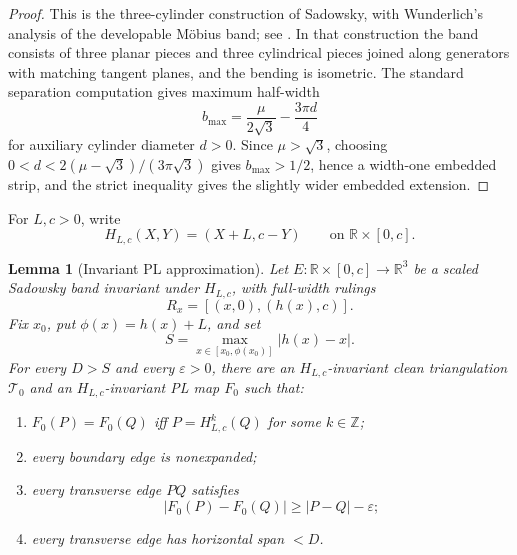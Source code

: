 \documentclass[12pt]{article}
\newcommand{\R}{\mathbb R}
\newcommand{\Z}{\mathbb Z}
\theoremstyle{plain}
\newtheorem{lemma}[theorem]{Lemma}
\begin{document}
\begin{proof}
This is the three-cylinder construction of Sadowsky, with Wunderlich's
analysis of the developable M\"obius band; see \cite{Sad30,Wun62}.  In that
construction the band consists of three planar pieces and three cylindrical
pieces joined along generators with matching tangent planes, and the bending is
isometric.  The standard separation computation gives maximum half-width
\[
b_{\max}=\frac{\mu}{2\sqrt3}-\frac{3\pi d}{4}
\]
for auxiliary cylinder diameter \(d>0\).  Since \(\mu>\sqrt3\), choosing
\(0<d<2(\mu-\sqrt3)/(3\pi\sqrt3)\) gives \(b_{\max}>1/2\), hence a width-one
embedded strip, and the strict inequality gives the slightly wider embedded
extension.
\end{proof}

For \(L,c>0\), write
\[
H_{L,c}(X,Y)=(X+L,c-Y)\qquad\text{on }\R\times[0,c].
\]

\begin{lemma}[Invariant PL approximation]\label{lem:PL}
Let \(E:\R\times[0,c]\to\R^3\) be a scaled Sadowsky band invariant under
\(H_{L,c}\), with full-width rulings
\[
R_x=[(x,0),(h(x),c)].
\]
Fix \(x_0\), put \(\phi(x)=h(x)+L\), and set
\[
S=\max_{x\in[x_0,\phi(x_0)]}|h(x)-x|.
\]
For every \(D>S\) and every \(\varepsilon>0\), there are an
\(H_{L,c}\)-invariant clean triangulation \(\mathcal T_0\) and an
\(H_{L,c}\)-invariant PL map \(F_0\) such that:
\begin{enumerate}
\item \(F_0(P)=F_0(Q)\) iff \(P=H_{L,c}^k(Q)\) for some \(k\in\Z\);
\item every boundary edge is nonexpanded;
\item every transverse edge \(PQ\) satisfies
\[
|F_0(P)-F_0(Q)|\ge |P-Q|-\varepsilon;
\]
\item every transverse edge has horizontal span \(<D\).
\end{enumerate}
\end{lemma}
\end{document}

